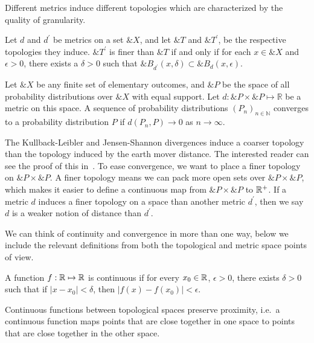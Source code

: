 Different metrics induce different topologies which are characterized
by the quality of granularity.

\begin{theorem}%
  \label{thm:granularity}
  Let $d$ and $d^\prime$ be metrics on a set $\&X$, and let $\&T$ and
  $\&T^\prime$, be the respective topologies they induce.
  $\&T^\prime$ is \textnormal{\sffamily finer} than $\&T$ if and only
  if for each $x \in \&X$ and $\epsilon > 0$, there exists a
  $\delta > 0$ such that
  $\&B_{d^\prime}(x, \delta) \subset \&B_d(x, \epsilon)$.
\end{theorem}

\begin{definition}%
  \label{def:convergence-metric-space}
  Let $\&X$ be any finite set of elementary outcomes, and $\&P$ be the
  space of all probability distributions over $\&X$ with equal
  support. Let $d: \&P \times \&P \mapsto \mathbb{R}$ be a metric on
  this space.  A sequence of probability distributions
  ${(P_n)}_{n \in \mathbb{N}}$ \textnormal{\sffamily converges} to a
  probability distribution $P$ if $d(P_n,P) \to 0$ as $n \to \infty$.
\end{definition}

The Kullback-Leibler and Jensen-Shannon divergences induce a coarser
topology than the topology induced by the earth mover distance. The
interested reader can see the proof of this
in~\cite{ref:arjovsky-2017}.  To ease convergence, we want to place a
finer topology on $\&P \times \&P$.  A finer topology means we can
pack more open sets over $\&P \times \&P$, which makes it easier to
define a continuous map from $\&P \times \&P$ to $\mathbb{R}^+$.  If a metric
$d$ induces a finer topology on a space than another metric
$d^\prime$, then we say $d$ is a weaker notion of distance than
$d^\prime$.

We can think of continuity and convergence in more than one way, below
we include the relevant definitions from both the topological and
metric space points of view.

\begin{definition}%
  \label{def:continuity-metric-space}
  A function $f: \mathbb{R} \mapsto \mathbb{R}$ is \textnormal{\sffamily continuous}
  if for every $x_0 \in \mathbb{R}$, $\epsilon > 0$, there exists $\delta > 0$
  such that if $|x - x_0| < \delta$, then
  $|f(x) - f(x_0)| < \epsilon$.
\end{definition}

Continuous functions between topological spaces preserve proximity,
i.e.\ a continuous function maps points that are close together in one
space to points that are close together in the other space.

